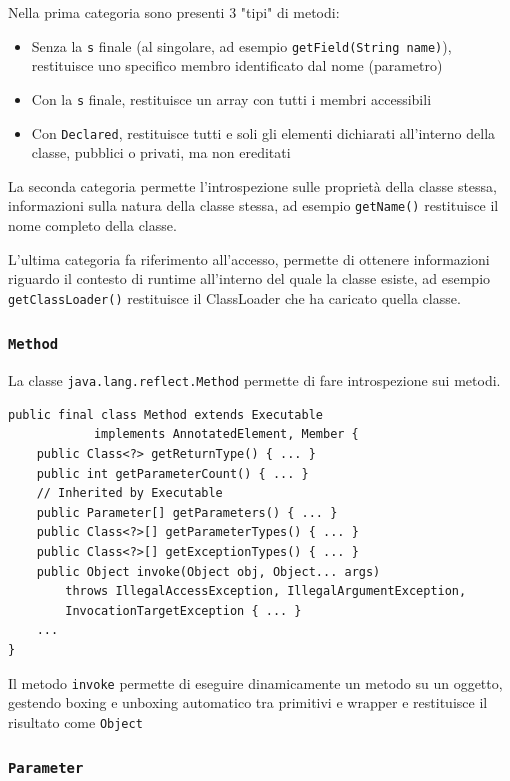 Nella prima categoria sono presenti 3 "tipi" di metodi:
\begin{itemize}
    \item Senza la \texttt{s} finale (al singolare, ad esempio \texttt{getField(String name)}), restituisce uno specifico membro identificato dal nome (parametro)

    \item Con la \texttt{s} finale, restituisce un array con tutti i membri accessibili

    \item Con \texttt{Declared}, restituisce tutti e soli gli elementi dichiarati all'interno della classe, pubblici o privati, ma non ereditati
\end{itemize}

La seconda categoria permette l'introspezione sulle proprietà della classe stessa, informazioni sulla natura della classe stessa, ad esempio \texttt{getName()} restituisce il nome completo della classe.

L'ultima categoria fa riferimento all'accesso, permette di ottenere informazioni riguardo il contesto di runtime all'interno del quale la classe esiste, ad esempio \texttt{getClassLoader()} restituisce il ClassLoader che ha caricato quella classe.

\subsubsection{\texttt{Method}}
La classe \texttt{java.lang.reflect.Method} permette di fare introspezione sui metodi.
\begin{verbatim}
public final class Method extends Executable
            implements AnnotatedElement, Member {
    public Class<?> getReturnType() { ... }
    public int getParameterCount() { ... }
    // Inherited by Executable
    public Parameter[] getParameters() { ... }
    public Class<?>[] getParameterTypes() { ... }
    public Class<?>[] getExceptionTypes() { ... }
    public Object invoke(Object obj, Object... args)
        throws IllegalAccessException, IllegalArgumentException,
        InvocationTargetException { ... }
    ...
}
\end{verbatim}

Il metodo \texttt{invoke} permette di eseguire dinamicamente un metodo su un oggetto, gestendo boxing e unboxing automatico tra primitivi e wrapper e restituisce il risultato come \texttt{Object}

\subsubsection{\texttt{Parameter}}

